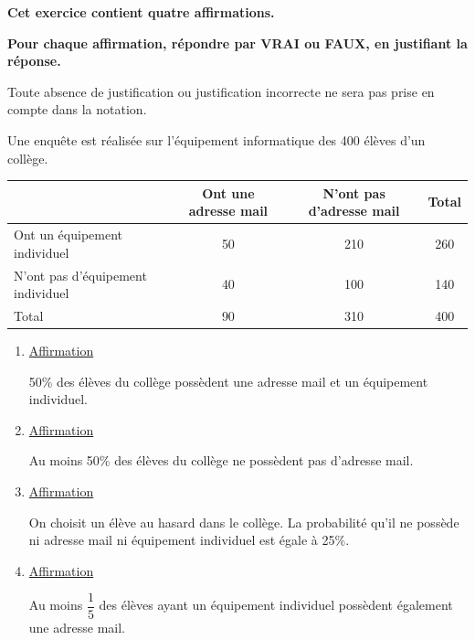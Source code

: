 \textbf{Cet exercice contient quatre affirmations.}\par
\textbf{Pour chaque affirmation, répondre par VRAI ou FAUX, en justifiant la réponse.}\par
Toute absence de justification ou justification incorrecte ne sera pas prise en compte dans la notation.

Une enquête est réalisée sur l'équipement informatique des 400 élèves d'un collège.
\begin{center}\renewcommand{\arraystretch}{1.35}
\begin{tabular}{|p{3.2cm}|c|c|c|}\hline
& Ont une adresse mail & N'ont pas d'adresse mail & Total\\\hline
Ont un équipement individuel & 50 & 210 & 260\\\hline
N'ont pas d'équipement individuel & 40 & 100 & 140\\\hline
Total & 90 & 310 & 400\\\hline
\end{tabular}
\end{center}

\begin{enumerate}
\item \underline{Affirmation}

50\% des élèves du collège possèdent une adresse mail et un équipement individuel.

\item \underline{Affirmation}

Au moins 50\% des élèves du collège ne possèdent pas d'adresse mail.

\item \underline{Affirmation}

On choisit un élève au hasard dans le collège. La probabilité qu'il ne possède ni adresse mail ni équipement individuel est égale à 25\%.

\item \underline{Affirmation}

Au moins $\dfrac{1}{5}$ des élèves ayant un équipement individuel possèdent également une adresse mail.
\end{enumerate}

